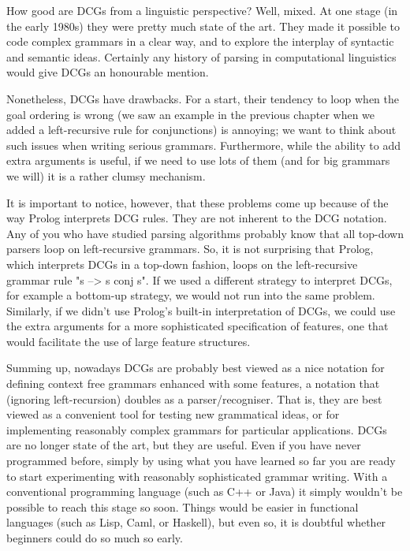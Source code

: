 How good are DCGs from a linguistic perspective?  Well, mixed.  At
one stage (in the early 1980s) they were pretty much state of the art.
They made it possible to code complex grammars in a clear way, and to
explore the interplay of syntactic and semantic ideas.  Certainly any
history of parsing in computational linguistics would give DCGs an
honourable mention.

Nonetheless, DCGs have drawbacks.  For a start, their tendency to loop
when the goal ordering is wrong (we saw an example in the previous
chapter when we added a left-recursive rule for conjunctions) is
annoying; we  want to think about such issues when
writing serious grammars. Furthermore, while the ability to add extra
arguments is useful, if we need to use lots of them (and for big
grammars we will) it is a rather clumsy mechanism.

It is important to notice, however, that these problems come up
because of the way Prolog interprets DCG rules. They are not inherent
to the DCG notation. Any of you who have studied parsing algorithms
probably know that all top-down parsers loop on left-recursive
grammars. So, it is not surprising that Prolog, which interprets DCGs
in a top-down fashion, loops on the left-recursive grammar rule
"s --> s conj s". If we used a different strategy to interpret DCGs, for
example a bottom-up strategy, we would not run into the same
problem. Similarly, if we didn't use Prolog's built-in interpretation
of DCGs, we could use the extra arguments for a more sophisticated
specification of features, one that would facilitate the use of large
feature structures.

Summing up, nowadays DCGs are probably best viewed as a nice notation
for defining context free grammars enhanced with some features, a
notation that (ignoring left-recursion) doubles as a
parser/recogniser.  That is, they are best viewed as a convenient tool
for testing new grammatical ideas, or for implementing reasonably
complex grammars for particular applications.  DCGs are no longer
state of the art, but they are useful.  Even if you have never
programmed before, simply by using what you have learned so far you
are ready to start experimenting with reasonably sophisticated grammar
writing.  With a conventional programming language (such as C++ or
Java) it simply wouldn't be possible to reach this stage so soon.
Things would be easier in functional languages (such as Lisp, Caml, or
Haskell), but even so, it is doubtful whether beginners could do so
much so early.

